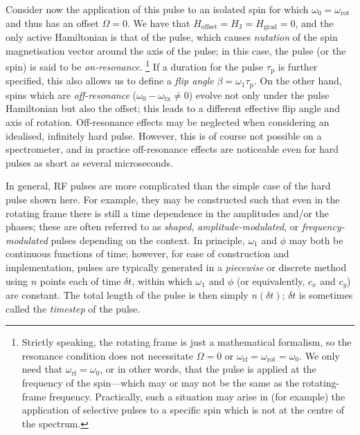 Consider now the application of this pulse to an isolated spin for which $\omega_0 = \omega_\text{rot}$ and thus has an offset $\Omega = 0$.
We have that $H_\text{offset} = H_\text{J} = H_\text{grad} = 0$, and the only active Hamiltonian is that of the pulse, which causes \textit{nutation} of the spin magnetisation vector around the axis of the pulse; in this case, the pulse (or the spin) is said to be \textit{on-resonance}.%
\footnote{Strictly speaking, the rotating frame is just a mathematical formalism, so the resonance condition does not necessitate $\Omega = 0$ or $\omega_\text{rf} = \omega_\text{rot} = \omega_0$. We only need that $\omega_\text{rf} = \omega_0$, or in other words, that the pulse is applied at the frequency of the spin---which may or may not be the same as the rotating-frame frequency. Practically, such a situation may arise in (for example) the application of selective pulses to a specific spin which is not at the centre of the spectrum.}
If a duration for the pulse $\tau_\text{p}$ is further specified, this also allows us to define a \textit{flip angle} $\beta = \omega_1 \tau_\text{p}$.
On the other hand, spins which are \textit{off-resonance} ($\omega_0 - \omega_\text{tx} \neq 0$) evolve not only under the pulse Hamiltonian but also the offset; this leads to a different effective flip angle and axis of rotation.
Off-resonance effects may be neglected when considering an idealised, infinitely hard pulse.
However, this is of course not possible on a spectrometer, and in practice off-resonance effects are noticeable even for hard pulses as short as several microseconds.

In general, RF pulses are more complicated than the simple case of the hard pulse shown here.
For example, they may be constructed such that even in the rotating frame there is still a time dependence in the amplitudes and/or the phases; these are often referred to as \textit{shaped}, \textit{amplitude-modulated}, or \textit{frequency-modulated} pulses depending on the context.
In principle, $\omega_1$ and $\phi$ may both be continuous functions of time; however, for ease of construction and implementation, pulses are typically generated in a \textit{piecewise} or discrete method using $n$ points each of time $\delta t$, within which $\omega_1$ and $\phi$  (or equivalently, $c_x$ and $c_y$) are constant.
The total length of the pulse is then simply $n(\delta t)$; $\delta t$ is sometimes called the \textit{timestep} of the pulse.
